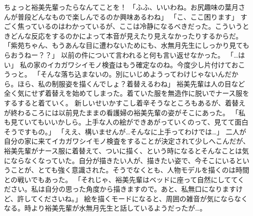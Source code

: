 ちょっと裕美先輩ったらなんてことを！
「ふふ、いいわね。お尻趣味の葉月さんが普段どんなもので楽しんでるのか興味あるわね」
「こ、ここ困ります」
すごく焦っているのはわかっているが、ここは冷静になるべきだった。こういうときどんな反応をするのかによって本音が見えたり見えなかったりするからだ。
「紫苑ちゃん、もうあんな目に遭わないためにも、水無月先生にしっかり見てもらおうねー？？」
以前の件について言われると何も言い返せなかった。
「…はい」
私の家のイカガワシイモノ検査はもう確定なのね。今度少し片付けておこうっと。
「そんな落ち込まないの。別にいじめようってわけじゃないんだから。ほら、私の制服姿を描くんでしょ？着替えるわね」
裕美先輩は人の目など全く気にせず着替えを始めてしまった。着ていた服を無造作に脱いでナース服をするすると着ていく。
新しいせいかすこし着辛そうなところもあるが、着替えが終わるころには以前見たままの看護婦の裕美先輩の姿がそこにあった。
「私も見ていてもいいかしら。上手な人の絵ができあがっていくのって、見てて面白そうですもの。」
「ええ、構いませんが…そんなに上手ってわけでは…」
二人が自分の家に来てイカガワシイモノ検査をすることが決定されて少しへこんだが、裕美先輩がナース服に着替えて、ついに描く、という時になるとそんなことは気にならなくなっていた。自分が描きたい人が、描きたい姿で、今そこにいるということが、とても強く意識された。そうでなくとも、人物モデルを描くのは時間との戦いでもあった。
「それじゃ、裕美先輩はベッドに座って自然にしててください。私は自分の思った角度から描きますので。あと、私無口になりますけど、許してくださいね。」
絵を描くモードになると、周囲の雑音が気にならなくなる。時より裕美先輩が水無月先生と話しているようだったが…。

